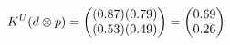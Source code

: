 \documentclass[preview]{standalone}
\begin{document}
\begin{align*}
\special{dvisvgm:raw <g id='unique000'>}K^U(d \otimes p) = \begin{pmatrix} (0.87)(0.79) \\ (0.53)(0.49) \end{pmatrix} = \begin{pmatrix} 0.69 \\ 0.26 \end{pmatrix}\special{dvisvgm:raw </g>}
\end{align*}
\end{document}
